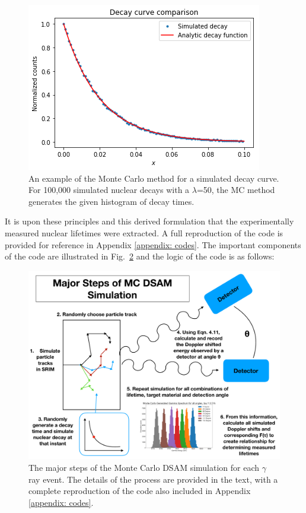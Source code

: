 \begin{figure}
\centering
\includegraphics[width=\linewidth]{figures/simCompareExample.png}
\caption{An example of the Monte Carlo method for a simulated decay curve. For 100,000 simulated nuclear decays with a $\lambda$=50, the MC method generates the given histogram of decay times.  }
\label{fig: simCompare}
\end{figure}


It is upon these principles and this derived formulation that the experimentally measured nuclear lifetimes were extracted. A full reproduction of the code is provided for reference in Appendix \ref{appendix: codes}. The important components of the code are illustrated in Fig.\ \ref{fig: simSteps} and the logic of the code is as follows:


\begin{figure}
\centering
\includegraphics[width=\linewidth]{figures/simSteps.pdf}
\caption{The major steps of the Monte Carlo DSAM simulation for each $\gamma$ ray event. The details of the process are provided in the text, with a complete reproduction of the code also included in Appendix \ref{appendix: codes}.}
\label{fig: simSteps}
\end{figure}


